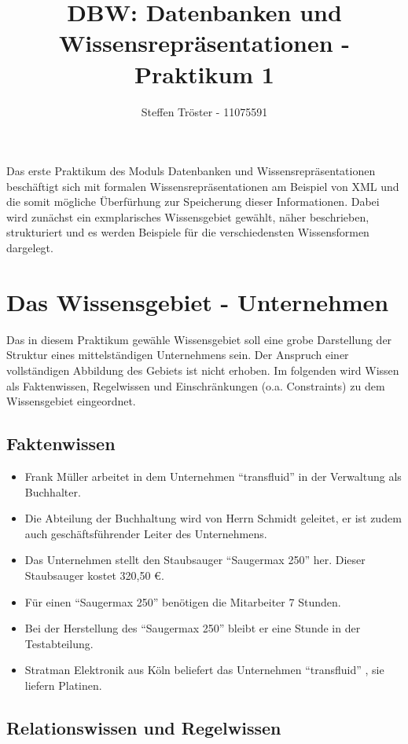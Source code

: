 \documentclass[DIV=calc,paper=a4,fontsize=9pt,twocolumn]{scrartcl}
\title{DBW: Datenbanken und Wissensrepräsentationen - Praktikum 1}
\author{Steffen Tröster - 11075591\\}
\date{}
\newcommand{\initial}[1]{
     \lettrine[lines=2,lhang=0.3,nindent=0em]{
                    \color{headblue}
                    {\textsf{#1}}}{}}
\begin{document}
\maketitle
\thispagestyle{fancy}		
\initial{D}as erste Praktikum des Moduls Datenbanken und Wissensrepräsentationen beschäftigt sich mit formalen Wissensrepräsentationen am Beispiel von XML und die somit mögliche Überfürhung zur Speicherung dieser Informationen. Dabei wird zunächst ein exmplarisches Wissensgebiet gewählt, näher beschrieben, strukturiert und es werden Beispiele für die verschiedensten Wissensformen dargelegt. 

\section{Das Wissensgebiet - Unternehmen}

Das in diesem Praktikum gewähle Wissensgebiet soll eine grobe Darstellung der Struktur eines mittelständigen Unternehmens sein. Der Anspruch einer vollständigen Abbildung des Gebiets ist nicht erhoben. Im folgenden wird Wissen als Faktenwissen, Regelwissen und Einschränkungen (o.a. Constraints) zu dem Wissensgebiet eingeordnet.

\subsection{Faktenwissen}
\begin{itemize}
    \item Frank Müller arbeitet in dem Unternehmen \enquote{transfluid} in der Verwaltung als Buchhalter.
    \item Die Abteilung der Buchhaltung wird von Herrn Schmidt geleitet, er ist zudem auch geschäftsführender Leiter des Unternehmens.
    \item Das Unternehmen stellt den Staubsauger \enquote{Saugermax 250} her. Dieser Staubsauger kostet 320,50 \euro .
    \item Für einen \enquote{Saugermax 250} benötigen die Mitarbeiter 7 Stunden.
    \item Bei der Herstellung des \enquote{Saugermax 250} bleibt er eine Stunde in der Testabteilung.
    \item Stratman Elektronik aus Köln beliefert das Unternehmen \enquote{transfluid} , sie liefern Platinen.
\end{itemize}

\subsection{Relationswissen und Regelwissen}
\end{document}
